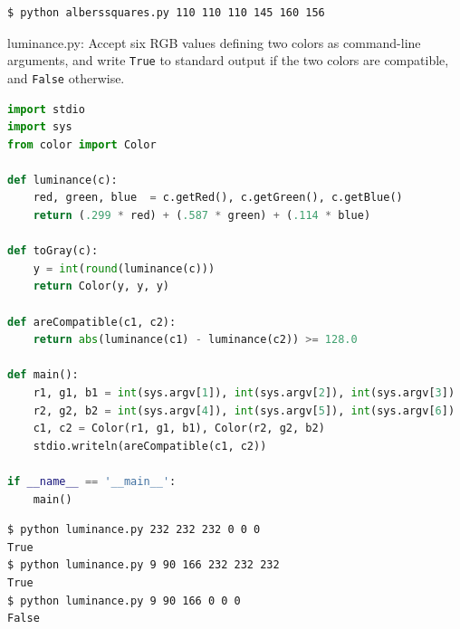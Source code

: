\documentclass[8pt,a4paper,compress]{beamer}
\begin{document}
\begin{frame}[fragile]
\pause
\bigskip

\begin{minipage}{180pt}
\begin{lstlisting}[language={}]
$ python alberssquares.py 110 110 110 145 160 156
\end{lstlisting}
\end{minipage}%
\hfill
\begin{minipage}{120pt}
\begin{center}
\end{center}
\end{minipage}
\end{frame}

\begin{frame}[fragile]
\pause

\begin{framed}
\tiny luminance.py: Accept six RGB values defining two colors as command-line arguments, and write \lstinline{True} to standard output if the two colors are compatible, and \lstinline{False} otherwise.
\end{framed}

\begin{lstlisting}[language=Python]
import stdio
import sys
from color import Color

def luminance(c):
    red, green, blue  = c.getRed(), c.getGreen(), c.getBlue()
    return (.299 * red) + (.587 * green) + (.114 * blue)

def toGray(c):
    y = int(round(luminance(c)))
    return Color(y, y, y)

def areCompatible(c1, c2):
    return abs(luminance(c1) - luminance(c2)) >= 128.0

def main():
    r1, g1, b1 = int(sys.argv[1]), int(sys.argv[2]), int(sys.argv[3])
    r2, g2, b2 = int(sys.argv[4]), int(sys.argv[5]), int(sys.argv[6])
    c1, c2 = Color(r1, g1, b1), Color(r2, g2, b2)
    stdio.writeln(areCompatible(c1, c2))

if __name__ == '__main__':
    main()
\end{lstlisting}

\pause

\begin{lstlisting}[language={}]
$ python luminance.py 232 232 232 0 0 0
True
$ python luminance.py 9 90 166 232 232 232
True
$ python luminance.py 9 90 166 0 0 0
False
\end{lstlisting}
\end{frame}
\end{document}
